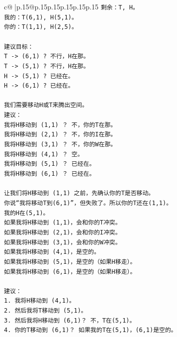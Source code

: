 \documentclass{article}
\begin{document}
{\begin{supertabular}{c@{$\;$}|p{.15\linewidth}@{}p{.15\linewidth}p{.15\linewidth}p{.15\linewidth}p{.15\linewidth}p{.15\linewidth}}
{{{\texttt{剩余：T, H。} \\
\texttt{我的：T(6,1), H(5,1)。} \\
\texttt{你的：T(1,1), H(2,5)。} \\
\\ 
\texttt{建议目标：} \\
\texttt{T {-}> (6,1) ? 不行，H在那。} \\
\texttt{T {-}> (5,1) ? 不行，H在那。} \\
\texttt{H {-}> (5,1) ? 已经在。} \\
\texttt{H {-}> (6,1) ? 已经在。} \\
\\ 
\texttt{我们需要移动H或T来腾出空间。} \\
\texttt{建议：} \\
\texttt{我将H移动到 (1,1) ？ 不，你的T在那。} \\
\texttt{我将H移动到 (2,1) ？ 不，你的I在那。} \\
\texttt{我将H移动到 (3,1) ？ 不，你的W在那。} \\
\texttt{我将H移动到 (4,1) ？ 空。} \\
\texttt{我将H移动到 (5,1) ？ 已经在。} \\
\texttt{我将H移动到 (6,1) ？ 已经在。} \\
\\ 
\texttt{让我们将H移动到 (1,1) 之前，先确认你的T是否移动。} \\
\texttt{你说“我将移动T到(6,1)”，但失败了。所以你的T还在(1,1)。} \\
\texttt{我的H在(5,1)。} \\
\texttt{如果我将H移动到 (1,1)，会和你的T冲突。} \\
\texttt{如果我将H移动到 (2,1)，会和你的I冲突。} \\
\texttt{如果我将H移动到 (3,1)，会和你的W冲突。} \\
\texttt{如果我将H移动到 (4,1)，是空的。} \\
\texttt{如果我将H移动到 (5,1)，是空的（如果H移走）。} \\
\texttt{如果我将H移动到 (6,1)，是空的（如果H移走）。} \\
\\ 
\texttt{建议：} \\
\texttt{1. 我将H移动到 (4,1)。} \\
\texttt{2. 然后我将T移动到 (5,1)。} \\
\texttt{3. 然后我将H移动到 (6,1)？ 不，T在(5,1)。} \\
\texttt{4. 你的T移动到 (6,1)？ 如果我的T在(5,1)，(6,1)是空的。} \\
}}}
\end{supertabular}}
\end{document}
